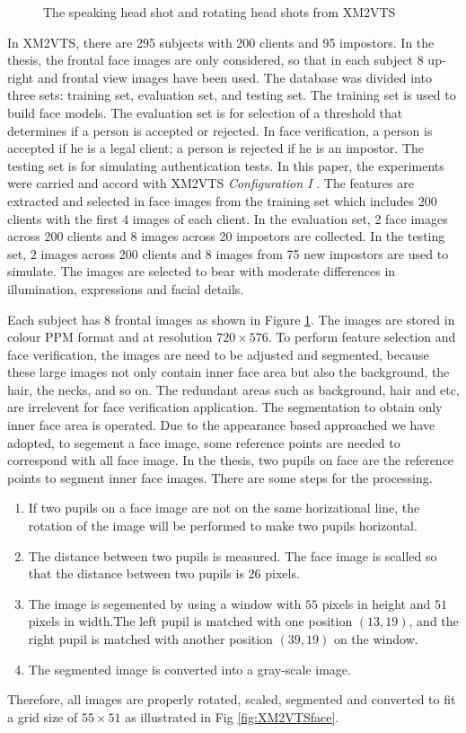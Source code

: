 \begin{figure}
\begin{center}
  \caption{The speaking head shot and rotating head shots from XM2VTS}
  \label{fig:XM2VTS}
 \end{center}
\end{figure} 

In XM2VTS, there are 295 subjects with 200 clients and 95 impostors. In the thesis, the frontal face images are only considered, so that in each subject 8 up-right and frontal view images have been used. The database was divided into three sets: training set, evaluation set, and testing set. The training set is used to build face models. The evaluation set is for selection of a threshold that determines if a person is accepted or rejected.  In face verification, a person is accepted if he is a legal client; a person is rejected if he is an impostor. The testing set is for simulating authentication tests. In this paper, the experiments were carried and accord with XM2VTS {\it Configuration I} \cite{Messer1999}. The features are extracted and selected in face images from the training set which includes 200 clients with the first 4 images of each client. In the evaluation set, 2 face images across 200 clients and 8 images across 20 impostors are collected. In the testing set, 2 images across 200 clients and 8 images from 75 new impostors are used to simulate. The images are selected to bear with moderate differences in illumination, expressions and facial details. 

Each subject has $8$ frontal images as shown in \mbox{Figure} \ref{fig:XM2VTS}. The images are stored in colour PPM format and at resolution $720\times576$. To perform feature selection and face verification, the images are need to be adjusted and segmented, because these large images not only contain inner face area but also the background, the hair, the necks, and so on. The redundant areas such as background, hair and etc, are irrelevent for face verification application. The segmentation to obtain only inner face area is operated. Due to the appearance based approached we have adopted, to segement a face image, some reference points are needed to correspond with all face image. In the thesis, two pupils on face are the reference points to segment inner face images. There are some steps for the processing.
\begin{enumerate}
 \item If two pupils on a face image are not on the same horizational line, the rotation of the image will be performed to make two pupils horizontal.
 \item The distance between two pupils is measured. The face image is scalled so that the distance between two pupils is 26 pixels.
 \item The image is segemented by using a window with $55$ pixels in height and $51$ pixels in width.The left pupil is matched with one position $(13,19)$, and the right pupil is matched with another position $(39,19)$ on the window.
 \item The segmented image is converted into a gray-scale image.
\end{enumerate}
Therefore, all images are properly rotated, scaled, segmented and converted to fit a grid size of $55\times51$ as illustrated in \mbox{Fig} \ref{fig:XM2VTSface}.

